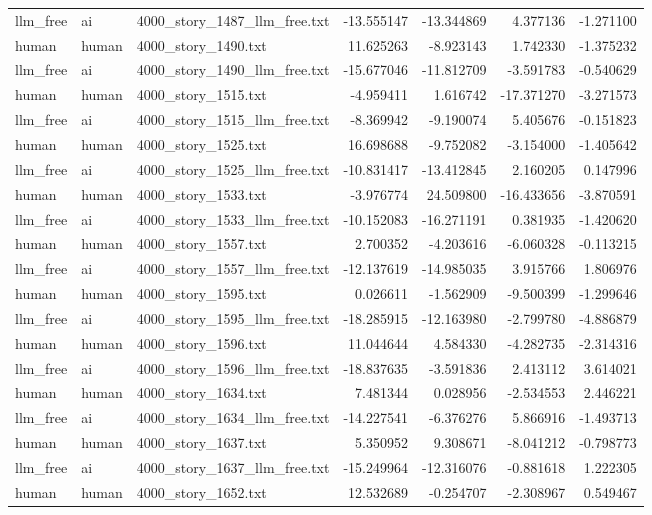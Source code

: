 \begin{longtable}{lllrrrr}
llm\_free & ai & 4000\_story\_1487\_llm\_free.txt & -13.555147 & -13.344869 & 4.377136 & -1.271100 \\
human & human & 4000\_story\_1490.txt & 11.625263 & -8.923143 & 1.742330 & -1.375232 \\
llm\_free & ai & 4000\_story\_1490\_llm\_free.txt & -15.677046 & -11.812709 & -3.591783 & -0.540629 \\
human & human & 4000\_story\_1515.txt & -4.959411 & 1.616742 & -17.371270 & -3.271573 \\
llm\_free & ai & 4000\_story\_1515\_llm\_free.txt & -8.369942 & -9.190074 & 5.405676 & -0.151823 \\
human & human & 4000\_story\_1525.txt & 16.698688 & -9.752082 & -3.154000 & -1.405642 \\
llm\_free & ai & 4000\_story\_1525\_llm\_free.txt & -10.831417 & -13.412845 & 2.160205 & 0.147996 \\
human & human & 4000\_story\_1533.txt & -3.976774 & 24.509800 & -16.433656 & -3.870591 \\
llm\_free & ai & 4000\_story\_1533\_llm\_free.txt & -10.152083 & -16.271191 & 0.381935 & -1.420620 \\
human & human & 4000\_story\_1557.txt & 2.700352 & -4.203616 & -6.060328 & -0.113215 \\
llm\_free & ai & 4000\_story\_1557\_llm\_free.txt & -12.137619 & -14.985035 & 3.915766 & 1.806976 \\
human & human & 4000\_story\_1595.txt & 0.026611 & -1.562909 & -9.500399 & -1.299646 \\
llm\_free & ai & 4000\_story\_1595\_llm\_free.txt & -18.285915 & -12.163980 & -2.799780 & -4.886879 \\
human & human & 4000\_story\_1596.txt & 11.044644 & 4.584330 & -4.282735 & -2.314316 \\
llm\_free & ai & 4000\_story\_1596\_llm\_free.txt & -18.837635 & -3.591836 & 2.413112 & 3.614021 \\
human & human & 4000\_story\_1634.txt & 7.481344 & 0.028956 & -2.534553 & 2.446221 \\
llm\_free & ai & 4000\_story\_1634\_llm\_free.txt & -14.227541 & -6.376276 & 5.866916 & -1.493713 \\
human & human & 4000\_story\_1637.txt & 5.350952 & 9.308671 & -8.041212 & -0.798773 \\
llm\_free & ai & 4000\_story\_1637\_llm\_free.txt & -15.249964 & -12.316076 & -0.881618 & 1.222305 \\
human & human & 4000\_story\_1652.txt & 12.532689 & -0.254707 & -2.308967 & 0.549467 \\

\end{longtable}
